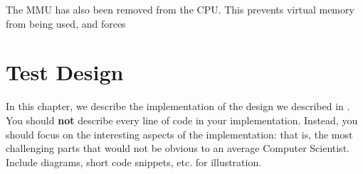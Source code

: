 The MMU has also been removed from the CPU. This prevents virtual memory from being used, and forces 

\chapter{Test Design}
\label{ch:test_design}

In this chapter, we describe the implementation of the design we described in . You should \textbf{not} describe every line of code in your implementation. Instead, you should focus on the interesting aspects of the implementation: that is, the most challenging parts that would not be obvious to an average Computer Scientist. Include diagrams, short code snippets, etc. for illustration.